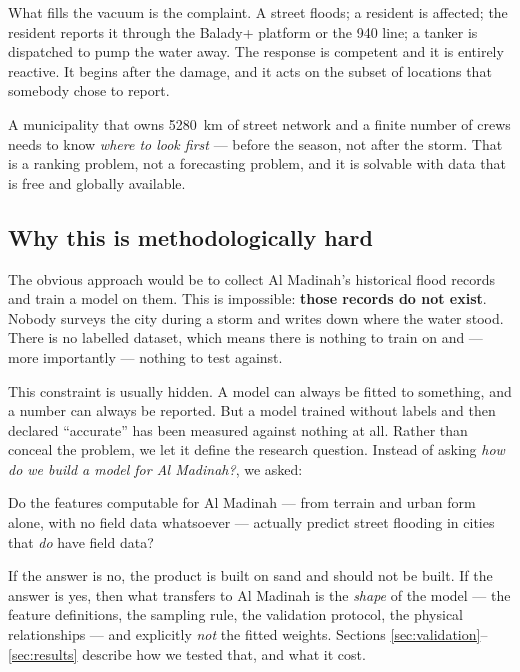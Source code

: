 \documentclass[11pt,a4paper]{article}
\begin{document}
What fills the vacuum is the complaint. A street floods; a resident is affected; the
resident reports it through the Balady+ platform or the 940 line; a tanker is dispatched
to pump the water away. The response is competent and it is entirely reactive. It begins
after the damage, and it acts on the subset of locations that somebody chose to report.

\begin{keybox}
A municipality that owns \SI{5280}{\kilo\metre} of street network and a finite number of
crews needs to know \emph{where to look first} --- before the season, not after the
storm. That is a ranking problem, not a forecasting problem, and it is solvable with
data that is free and globally available.
\end{keybox}

\subsection{Why this is methodologically hard}
The obvious approach would be to collect Al Madinah's historical flood records and train
a model on them. This is impossible: \textbf{those records do not exist}. Nobody surveys
the city during a storm and writes down where the water stood. There is no labelled
dataset, which means there is nothing to train on and --- more importantly --- nothing
to test against.

This constraint is usually hidden. A model can always be fitted to something, and a
number can always be reported. But a model trained without labels and then declared
``accurate'' has been measured against nothing at all. Rather than conceal the problem,
we let it define the research question. Instead of asking \emph{how do we build a model
for Al Madinah?}, we asked:

\begin{notebox}
Do the features computable for Al Madinah --- from terrain and urban form alone, with no
field data whatsoever --- actually predict street flooding in cities that \emph{do} have
field data?
\end{notebox}

If the answer is no, the product is built on sand and should not be built. If the answer
is yes, then what transfers to Al Madinah is the \emph{shape} of the model --- the
feature definitions, the sampling rule, the validation protocol, the physical
relationships --- and explicitly \emph{not} the fitted weights. Sections
\ref{sec:validation}--\ref{sec:results} describe how we tested that, and what it cost.
\end{document}
